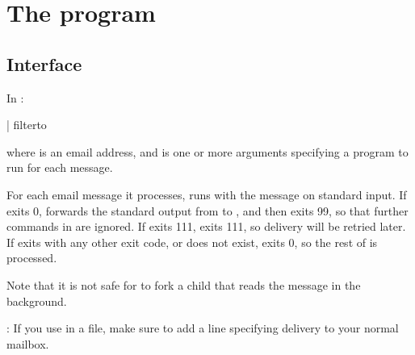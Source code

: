 
\chapter{The  program}

\section{Interface}
In :
\begin{code}
  | filterto  
\end{code}
where  is an email address, and  is one or
more arguments specifying a program to run for each message.

For each email message it processes,  runs 
with the message on standard input.  If  exits 0,
 forwards the standard output from  to
, and then exits 99, so that further commands in
 are ignored.  If  exits 111, 
exits 111, so delivery will be retried later.  If  exits
with any other exit code, or does not exist,  exits 0,
so the rest of  is processed.

Note that it is not safe for  to fork a child that reads
the message in the background.

: If you use  in a  file, make
sure to add a line specifying delivery to your normal mailbox.

